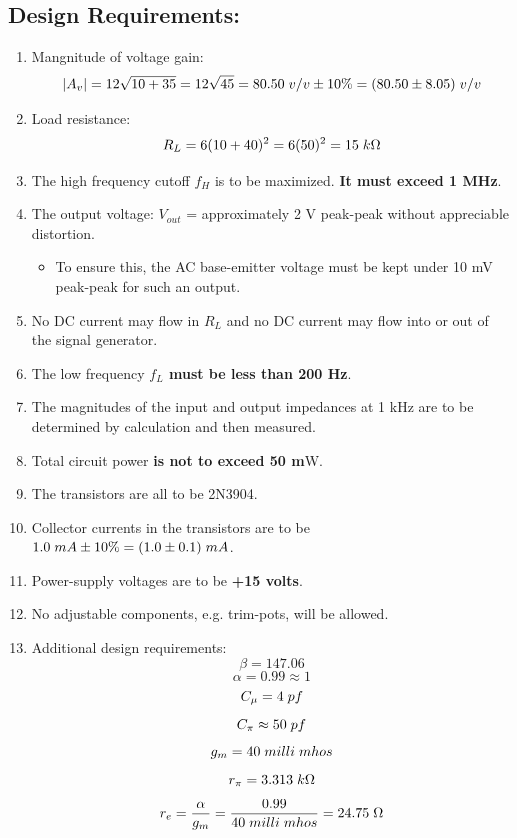 \documentclass{article}
\begin{document}
	\subsection*{Design Requirements:}
	\begin{enumerate}
		\item Mangnitude of voltage gain: $$|A_v| = 12\sqrt{10 + 35} = 12\sqrt{45} = 80.50 \hspace{1mm} v/v \pm 10\% = (80.50 \pm 8.05) \hspace{1mm} v/v$$
		\item Load resistance: $$R_L = 6(10 + 40)^{2} = 6(50)^{2} = 15 \hspace{1mm} k\Omega$$
		\item The high frequency cutoff $f_H$ is to be maximized. \textbf{It must exceed 1 MHz}.
		\item The output voltage: $V_{out}$ = approximately 2 V peak-peak without appreciable distortion.
		\begin{itemize}
			\item To ensure this, the AC base-emitter voltage must be kept under 10 mV peak-peak for such an output.
		\end{itemize}
		\item No DC current may flow in $R_L$ and no DC current may flow into or out of the signal generator.
		\item The low frequency \textbf{$f_L$ must be less than 200 Hz}.
		\item The magnitudes of the input and output impedances at 1 kHz are to be determined by calculation and then measured.
		\item Total circuit power \textbf{is not to exceed 50 m}W.
		\item The transistors are all to be 2N3904.
		\item Collector currents in the transistors are to be $1.0 \hspace{1mm} mA \pm 10\% = (1.0 \pm 0.1) \hspace{1mm} mA$.
		\item Power-supply voltages are to be \textbf{+15 volts}.
		\item No adjustable components, e.g. trim-pots, will be allowed.
		\item Additional design requirements:		
		$$\beta = 147.06$$
		$$\alpha = 0.99 \approx 1$$
		$$C_{\mu} = 4 \hspace{1mm} pf$$
		$$C_{\pi} \approx 50 \hspace{1mm} pf$$
		$$g_m = 40 \hspace{1mm} milli \hspace{1mm} mhos$$
		$$r_{\pi} = 3.313 \hspace{1mm} k\Omega$$
		$$r_e = \frac{\alpha}{g_m} = \frac{0.99}{40 \hspace{1mm} milli \hspace{1mm} mhos} = 24.75 \hspace{1mm} \Omega$$			
	\end{enumerate}		
\end{document}
